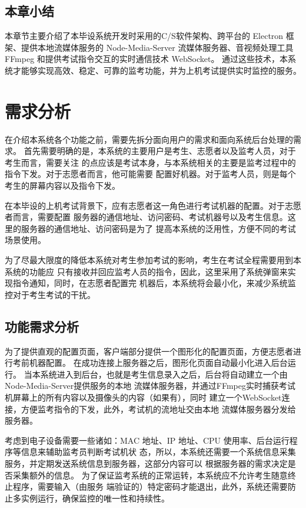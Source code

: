 \subsection{本章小结}

本章节主要介绍了本毕设系统开发时采用的C/S软件架构、跨平台的 Electron 框架、提供本地流媒体服务的
Node-Media-Server 流媒体服务器、音视频处理工具 FFmpeg 和提供考试指令交互的实时通信技术 WebSocket。
通过这些技术，本系统才能够实现高效、稳定、可靠的监考功能，并为上机考试提供实时监控的服务。

\newpage    %

\section{需求分析}

在介绍本系统各个功能之前，需要先拆分面向用户的需求和面向系统后台处理的需求。
首先需要明确的是，本系统的主要用户是考生、志愿者以及监考人员，对于考生而言，需要关注
的点应该是考试本身，与本系统相关的主要是监考过程中的指令下发。对于志愿者而言，他可能需要
配置好机器。对于监考人员，则是每个考生的屏幕内容以及指令下发。

在本毕设的上机考试背景下，应有志愿者这一角色进行考试机器的配置。对于志愿者而言，需要配置
服务器的通信地址、访问密码、考试机器号以及考生信息。这里的服务器的通信地址、访问密码是为了
提高本系统的泛用性，方便不同的考试场景使用。

为了尽最大限度的降低本系统对考生参加考试的影响，考生在考试全程需要用到本系统的功能应
只有接收并回应监考人员的指令，因此，这里采用了系统弹窗来实现指令通知，同时，在志愿者配置完
机器后，本系统将会最小化，来减少系统监控对于考生考试的干扰。

\subsection{功能需求分析}

为了提供直观的配置页面，客户端部分提供一个图形化的配置页面，方便志愿者进行考前机器配置。
在成功连接上服务器之后，图形化页面自动最小化进入后台运行。
当本系统进入到后台，也就是考生信息录入之后，后台将自动建立一个由Node-Media-Server提供服务的本地
流媒体服务器，并通过FFmpeg实时捕获考试机屏幕上的所有内容以及摄像头的内容（如果有），同时
建立一个WebSocket连接，方便监考指令的下发，此外，考试机的流地址交由本地
流媒体服务器分发给服务器。

考虑到电子设备需要一些诸如：MAC 地址、IP 地址、CPU 使用率、后台运行程序等信息来辅助监考员判断考试机状
态，所以，本系统还需要一个系统信息采集服务，并定期发送系统信息到服务器，这部分内容可以
根据服务器的需求决定是否采集额外的信息。
为了保证监考系统的正常运转，本系统应不允许考生随意终止程序，需要输入（由服务
端验证的）特定密码才能退出，此外，系统还需要防止多实例运行，确保监控的唯一性和持续性。

